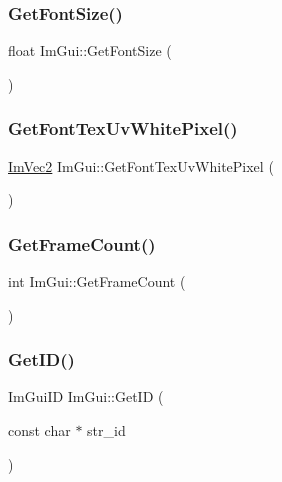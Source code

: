 \hypertarget{namespace_im_gui_ac592ae8e0aa4a1a06502ec7872bc8da8}{}\label{namespace_im_gui_ac592ae8e0aa4a1a06502ec7872bc8da8} 
\subsubsection{\texorpdfstring{Get\+Font\+Size()}{GetFontSize()}}
{\footnotesize\ttfamily float Im\+Gui\+::\+Get\+Font\+Size (\begin{DoxyParamCaption}{ }\end{DoxyParamCaption})}

\hypertarget{namespace_im_gui_a3092da6abc1d04f3287c084435dc6026}{}\label{namespace_im_gui_a3092da6abc1d04f3287c084435dc6026} 
\subsubsection{\texorpdfstring{Get\+Font\+Tex\+Uv\+White\+Pixel()}{GetFontTexUvWhitePixel()}}
{\footnotesize\ttfamily \hyperlink{struct_im_vec2}{Im\+Vec2} Im\+Gui\+::\+Get\+Font\+Tex\+Uv\+White\+Pixel (\begin{DoxyParamCaption}{ }\end{DoxyParamCaption})}

\hypertarget{namespace_im_gui_a0180211f23fc10807dfc3d2f6e8681f9}{}\label{namespace_im_gui_a0180211f23fc10807dfc3d2f6e8681f9} 
\subsubsection{\texorpdfstring{Get\+Frame\+Count()}{GetFrameCount()}}
{\footnotesize\ttfamily int Im\+Gui\+::\+Get\+Frame\+Count (\begin{DoxyParamCaption}{ }\end{DoxyParamCaption})}

\hypertarget{namespace_im_gui_a3329b04bd4235e90ad9deb00ffb38ae4}{}\label{namespace_im_gui_a3329b04bd4235e90ad9deb00ffb38ae4} 
\subsubsection{\texorpdfstring{Get\+I\+D()}{GetID()}\hspace{0.1cm}{\footnotesize\ttfamily [1/3]}}
{\footnotesize\ttfamily Im\+Gui\+ID Im\+Gui\+::\+Get\+ID (\begin{DoxyParamCaption}\item[{const char $\ast$}]{str\+\_\+id }\end{DoxyParamCaption})}

